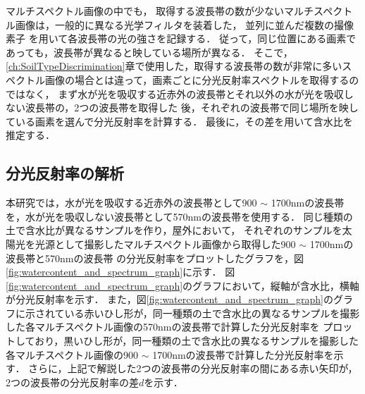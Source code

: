 マルチスペクトル画像の中でも，
取得する波長帯の数が少ないマルチスペクトル画像は，一般的に異なる光学フィルタを装着した，
並列に並んだ複数の撮像素子
を用いて各波長帯の光の強さを記録する．
従って，同じ位置にある画素であっても，波長帯が異なると映している場所が異なる．
そこで，\ref{ch:SoilTypeDiscrimination}章で使用した，取得する波長帯の数が非常に多いスペクトル画像の場合とは違って，画素ごとに分光反射率スペクトルを取得するのではなく，
まず水が光を吸収する近赤外の波長帯とそれ以外の水が光を吸収しない波長帯の，2つの波長帯を取得した
後，それぞれの波長帯で同じ場所を映している画素を選んで分光反射率を計算する．
最後に，その差を用いて含水比を推定する．

\clearpage

\subsection{分光反射率の解析}
\label{ssec:AnalysisOfSpectrum}

本研究では，水が光を吸収する近赤外の波長帯として900 $\sim$ 1700nmの波長帯を，水が光を吸収しない波長帯として570nmの波長帯を使用する．
同じ種類の土で含水比が異なるサンプルを作り，屋外において，
それぞれのサンプルを太陽光を光源として撮影したマルチスペクトル画像から取得した900 $\sim$ 1700nmの波長帯と570nmの波長帯
の分光反射率をプロットしたグラフを，図\ref{fig:watercontent_and_spectrum_graph}に示す．
図\ref{fig:watercontent_and_spectrum_graph}のグラフにおいて，縦軸が含水比，横軸が分光反射率を示す．
また，図\ref{fig:watercontent_and_spectrum_graph}のグラフに示されている赤いひし形が，同一種類の土で含水比の異なるサンプルを撮影した各マルチスペクトル画像の570nmの波長帯で計算した分光反射率を
プロットしており，黒いひし形が，同一種類の土で含水比の異なるサンプルを撮影した各マルチスペクトル画像の900 $\sim$ 1700nmの波長帯で計算した分光反射率を示す．
さらに，上記で解説した2つの波長帯の分光反射率の間にある赤い矢印が，2つの波長帯の分光反射率の差$d$を示す．

